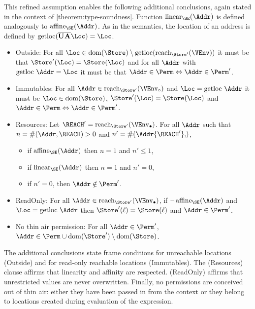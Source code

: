 This refined assumption enables the following additional conclusions,
again stated in the context of \cref{theorem:type-soundness}. Function
$\Linear{\SE}\Addr$ is defined analogously to  $\Affine{\SE}\Addr$.  As
in the semantics, the location of an address is defined by $\text{getloc}
(\Multi\IBORROW\Multi\MBORROW\Loc) = \Loc$. 
\begin{itemize}
\item Outside:
  For all $\Loc \in \Dom{\Store} \setminus \text{getloc} (\Reach{\Store'}{\VEnv})$ it must be that 
  $\Store' (\Loc) = \Store (\Loc)$
  and for all $\Addr$ with $\text{getloc }\Addr=\Loc$ it must be that
  $\Addr\in\Perm \Leftrightarrow \Addr\in\Perm'$. 
\item Immutables: For all $\Addr \in
  \Reach{\Store'}{\ImmutableBorrows\VEnv}$ 
  and $\Loc = \text{getloc }\Addr$
  it must be 
  $\Loc\in\Dom\Store$, 
  $\Store' (\Loc) = \Store (\Loc)$
  and $\Addr\in\Perm \Leftrightarrow \Addr\in\Perm'$.
\item Resources:
  Let $\REACH' =\Reach{\Store'}{\Active\VEnv}$.
  For all $\Addr$ such that $n= \MultiNumber\Addr\REACH >0$ and $n' =
  \MultiNumber\Addr{\REACH'}$, 
  \begin{itemize}
  \item if $\Affine{\SE}\Addr$ then $n=1$ and $n'\le 1$,
  \item if $\Linear{\SE}\Addr$ then $n=1$ and $n' = 0$,
  \item if $n'=0$, then $\Addr\notin\Perm'$.
  \end{itemize}
\item ReadOnly: For all $\Addr \in \Reach
  {\Store'}{\Active\VEnv}$, if $\neg\Writeable{\SE}\Addr$
  and $\Loc = \text{getloc }\Addr$
  then
  $\Store' (\ell) = \Store (\ell)$ and $\Addr\in \Perm'$.
\item No thin air permission: For all $\Addr\in \Perm'$, $\Addr
  \in \Perm \cup  \Dom{\Store'} \setminus \Dom{\Store}$.
\end{itemize}
The additional conclusions state frame conditions for unreachable
locations (Outside) and for read-only reachable locations
(Immutables). The (Resources) clause affirms that linearity and
affinity are respected. (ReadOnly) affirms that unrestricted values
are never overwritten. Finally, no permissions are conceived out of
thin air: either they have been passed in from the context or they
belong to locations created during evaluation of the expression.

\lstDeleteShortInline@


